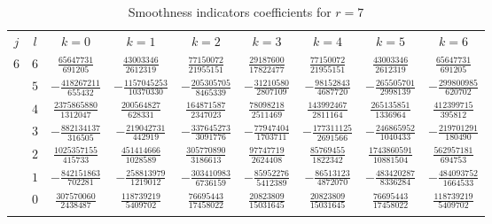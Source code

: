 \begin{table}
  \begin{center}
    \caption{Smoothness indicators coefficients for $r=7$}
    \label{tab:IS_7}
    \begin{tabular}{ccccccccc}
      \toprule
      $j$  &  $l$  &  $k=0$                          &  $k=1$                           &  $k=2$                            &  $k=3$                           &  $k=4$                            &  $k=5$                            &  $k=6$                          \\ \addlinespace
      $6$  &  $6$  &  $ \frac{  65647731}{ 691205}$  &  $ \frac{  43003346}{ 2612319}$  &  $ \frac{   77150072}{21955151}$  &  $ \frac{  29187600}{17822477}$  &  $ \frac{   77150072}{21955151}$  &  $ \frac{  43003346}{ 2612319} $  &  $ \frac{  65647731}{ 691205}$  \\ \addlinespace
           &  $5$  &  $-\frac{ 418267211}{ 655432}$  &  $-\frac{1157045253}{10370330}$  &  $-\frac{  205305705}{ 8465339}$  &  $-\frac{  31210580}{ 2807109}$  &  $-\frac{   98152843}{ 4687720}$  &  $-\frac{ 265505701}{ 2998139} $  &  $-\frac{ 299800985}{ 620702}$  \\ \addlinespace
           &  $4$  &  $ \frac{2375865880}{1312047}$  &  $ \frac{ 200564827}{  628331}$  &  $ \frac{  164871587}{ 2347023}$  &  $ \frac{  78098218}{ 2511469}$  &  $ \frac{  143992467}{ 2811164}$  &  $ \frac{ 265135851}{ 1336964} $  &  $ \frac{ 412399715}{ 395812}$  \\ \addlinespace
           &  $3$  &  $-\frac{ 882134137}{ 316505}$  &  $-\frac{ 219042731}{  442919}$  &  $-\frac{  337645273}{ 3091776}$  &  $-\frac{  77947404}{ 1703711}$  &  $-\frac{  177311125}{ 2691566}$  &  $-\frac{ 246865952}{ 1040433} $  &  $-\frac{ 219701291}{ 180490}$  \\ \addlinespace
           &  $2$  &  $ \frac{1025357155}{ 415733}$  &  $ \frac{ 451414666}{ 1028589}$  &  $ \frac{  305770890}{ 3186613}$  &  $ \frac{  97747719}{ 2624408}$  &  $ \frac{   85769455}{ 1822342}$  &  $ \frac{1743860591}{10881504} $  &  $ \frac{ 562957181}{ 694753}$  \\ \addlinespace
           &  $1$  &  $-\frac{ 842151863}{ 702281}$  &  $-\frac{ 258813979}{ 1219012}$  &  $-\frac{  303410983}{ 6736159}$  &  $-\frac{  85952276}{ 5412389}$  &  $-\frac{   86513123}{ 4872070}$  &  $-\frac{ 483420287}{ 8336284} $  &  $-\frac{ 484093752}{1664533}$  \\ \addlinespace
           &  $0$  &  $ \frac{ 307570060}{2438487}$  &  $ \frac{ 118739219}{ 5409702}$  &  $ \frac{   76695443}{17458022}$  &  $ \frac{  20823809}{15031645}$  &  $ \frac{   20823809}{15031645}$  &  $ \frac{  76695443}{17458022} $  &  $ \frac{ 118739219}{5409702}$  \\ \addlinespace

\end{tabular}
\end{center}
\end{table}
